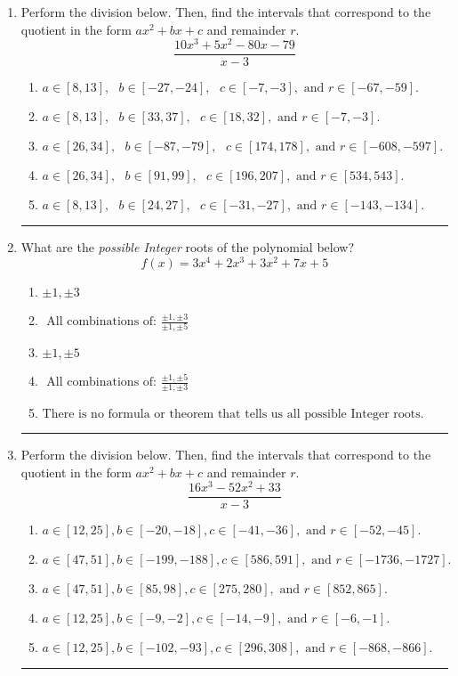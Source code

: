 \documentclass[14pt]{extbook}
\newcommand{\litem}[1]{\item#1\hspace*{-1cm}\rule{\textwidth}{0.4pt}}
\begin{document}
\begin{enumerate}
\litem{
Perform the division below. Then, find the intervals that correspond to the quotient in the form $ax^2+bx+c$ and remainder $r$.\[ \frac{10x^{3} +5 x^{2} -80 x -79}{x -3} \]\begin{enumerate}[label=\Alph*.]
\item \( a \in [8, 13], \text{   } b \in [-27, -24], \text{   } c \in [-7, -3], \text{   and   } r \in [-67, -59]. \)
\item \( a \in [8, 13], \text{   } b \in [33, 37], \text{   } c \in [18, 32], \text{   and   } r \in [-7, -3]. \)
\item \( a \in [26, 34], \text{   } b \in [-87, -79], \text{   } c \in [174, 178], \text{   and   } r \in [-608, -597]. \)
\item \( a \in [26, 34], \text{   } b \in [91, 99], \text{   } c \in [196, 207], \text{   and   } r \in [534, 543]. \)
\item \( a \in [8, 13], \text{   } b \in [24, 27], \text{   } c \in [-31, -27], \text{   and   } r \in [-143, -134]. \)

\end{enumerate} }
\litem{
What are the \textit{possible Integer} roots of the polynomial below?\[ f(x) = 3x^{4} +2 x^{3} +3 x^{2} +7 x + 5 \]\begin{enumerate}[label=\Alph*.]
\item \( \pm 1,\pm 3 \)
\item \( \text{ All combinations of: }\frac{\pm 1,\pm 3}{\pm 1,\pm 5} \)
\item \( \pm 1,\pm 5 \)
\item \( \text{ All combinations of: }\frac{\pm 1,\pm 5}{\pm 1,\pm 3} \)
\item \( \text{There is no formula or theorem that tells us all possible Integer roots.} \)

\end{enumerate} }
\litem{
Perform the division below. Then, find the intervals that correspond to the quotient in the form $ax^2+bx+c$ and remainder $r$.\[ \frac{16x^{3} -52 x^{2} + 33}{x -3} \]\begin{enumerate}[label=\Alph*.]
\item \( a \in [12, 25], b \in [-20, -18], c \in [-41, -36], \text{ and } r \in [-52, -45]. \)
\item \( a \in [47, 51], b \in [-199, -188], c \in [586, 591], \text{ and } r \in [-1736, -1727]. \)
\item \( a \in [47, 51], b \in [85, 98], c \in [275, 280], \text{ and } r \in [852, 865]. \)
\item \( a \in [12, 25], b \in [-9, -2], c \in [-14, -9], \text{ and } r \in [-6, -1]. \)
\item \( a \in [12, 25], b \in [-102, -93], c \in [296, 308], \text{ and } r \in [-868, -866]. \)


\end{enumerate}}
\end{enumerate}
\end{document}
